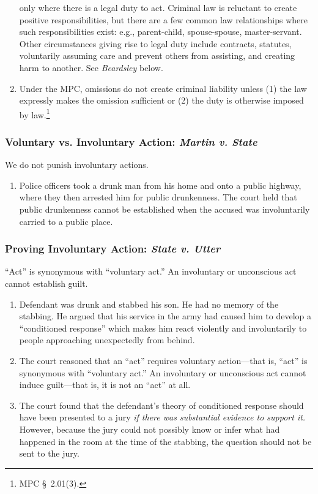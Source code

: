 \begin{enumerate}
    only where there is a legal duty to act. Criminal law is reluctant to 
    create positive responsibilities, but there are a few common law 
    relationships where such responsibilities exist: e.g., parent-child, 
    spouse-spouse, master-servant.  Other circumstances giving rise to legal 
    duty include contracts, statutes, voluntarily assuming care and prevent 
    others from assisting, and creating harm to another. See \emph{Beardsley} 
    below.
    \item Under the MPC, omissions do not create criminal liability unless (1) 
    the law expressly makes the omission sufficient or (2) the duty is 
    otherwise imposed by law.\footnote{MPC \S\ 2.01(3).}
\end{enumerate}

\subsubsection{Voluntary vs. Involuntary Action: \emph{Martin v. State}}

We do not punish involuntary actions.

\begin{enumerate}
    \item Police officers took a drunk man from his home and onto a public 
    highway, where they then arrested him for public drunkenness. The court 
    held that public drunkenness cannot be established when the accused was 
    involuntarily carried to a public place.
\end{enumerate}

\subsubsection{Proving Involuntary Action: \emph{State v. Utter}}

``Act'' is synonymous with ``voluntary act.'' An involuntary or unconscious 
act cannot establish guilt.

\begin{enumerate}
    \item Defendant was drunk and stabbed his son. He had no memory of the 
    stabbing. He argued that his service in the army had caused him to develop 
    a ``conditioned response'' which makes him react violently and 
    involuntarily to people approaching unexpectedly from behind.
    \item The court reasoned that an ``act'' requires voluntary action---that 
    is, ``act'' is synonymous with ``voluntary act.'' An involuntary or 
    unconscious act cannot induce guilt---that is, it is not an ``act'' at 
    all.
    \item The court found that the defendant's theory of conditioned response 
    should have been presented to a jury \emph{if there was substantial 
    evidence to support it.} However, because the jury could not possibly know 
    or infer what had happened in the room at the time of the stabbing, the 
    question should not be sent to the jury.
\end{enumerate}

